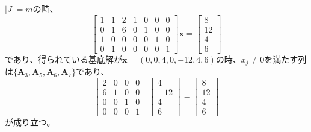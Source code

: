 \documentclass{jsarticle}
\begin{document}
$|J|=m$の時、
\begin{equation}
  \left[\begin{array}{lllllll}
  1 & 1 & 2 & 1 & 0 & 0 & 0 \\
  0 & 1 & 6 & 0 & 1 & 0 & 0 \\
  1 & 0 & 0 & 0 & 0 & 1 & 0 \\
  0 & 1 & 0 & 0 & 0 & 0 & 1
  \end{array}\right] \mathbf{x}=\left[\begin{array}{r}
  8 \\
  12 \\
  4 \\
  6
  \end{array}\right]
\end{equation}
であり、得られている基底解が$\bm{x}=(0,0,4,0,-12,4,6)$の時、$x_j \neq 0$を満たす列は$\{\bm{A}_3,\bm{A}_5,\bm{A}_6,\bm{A}_7\}$であり、
\begin{equation}
  \left[\begin{array}{lllllll}
  2 & 0 & 0 & 0 \\
  6 & 1 & 0 & 0 \\
  0 & 0 & 1 & 0 \\
  0 & 0 & 0 & 1
  \end{array}\right] 
  \left[\begin{array}{r}
    4 \\
    -12 \\
    4 \\
    6
    \end{array}\right]
  =\left[\begin{array}{r}
  8 \\
  12 \\
  4 \\
  6
  \end{array}\right]
\end{equation}
が成り立つ。
\end{document}
